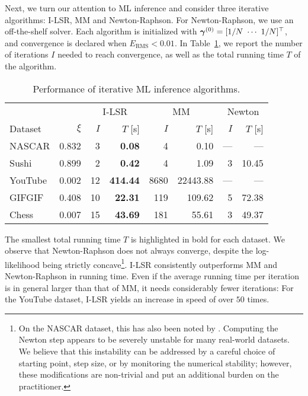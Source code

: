 Next, we turn our attention to ML inference and consider three iterative algorithms: I-LSR, MM and Newton-Raphson.
For Newton-Raphson, we use an off-the-shelf solver.
Each algorithm is initialized with $\bm{\gamma}^{(0)} = [1/N \  \cdots \  1/N]^\top$, and convergence is declared when $E_{\text{RMS}} < 0.01$.
In Table~\ref{fi:tab:mlalg}, we report the number of iterations $I$ needed to reach convergence, as well as the total running time $T$ of the algorithm.

\begin{table}[ht]
  \caption{Performance of iterative ML inference algorithms.}
  \label{fi:tab:mlalg}
  \centering
  \small{
  \begin{tabular}{l r rr rr rr}
    \toprule
             &             & \multicolumn{2}{c}{I-LSR}        & \multicolumn{2}{c}{MM}      & \multicolumn{2}{c}{Newton} \\
                             \cmidrule(l){3-4}                  \cmidrule(l){5-6}             \cmidrule(l){7-8}
    Dataset  & $\xi$               & $I$ &         $T$ [s] &        $I$ &        $T$ [s] &     $I$ &     $T$ [s] \\
    \midrule
    NASCAR   & \num{0.832} &  \num{3} &   \bfseries\num{0.08} &    \num{4} &     \num{0.10} &     --- &         --- \\
    Sushi    & \num{0.899} &  \num{2} &   \bfseries\num{0.42} &    \num{4} &     \num{1.09} & \num{3} & \num{10.45} \\
    \addlinespace
    YouTube  & \num{0.002} & \num{12} & \bfseries\num{414.44} & \num{8680} & \num{22443.88} &     --- &         --- \\
    GIFGIF   & \num{0.408} & \num{10} &  \bfseries\num{22.31} &  \num{119} &   \num{109.62} & \num{5} & \num{72.38} \\
    \addlinespace
    Chess    & \num{0.007} & \num{15} &  \bfseries\num{43.69} &  \num{181} &    \num{55.61} & \num{3} & \num{49.37} \\
    \bottomrule
  \end{tabular}
  }
\end{table}

The smallest total running time $T$ is highlighted in bold for each dataset.
We observe that Newton-Raphson does not always converge, despite the log-likelihood being strictly concave\footnote{%
On the NASCAR dataset, this has also been noted by \citet{hunter2004mm}.
Computing the Newton step appears to be severely unstable for many real-world datasets.
We believe that this instability can be addressed by a careful choice of starting point, step size, or by monitoring the numerical stability;
however, these modifications are non-trivial and put an additional burden on the practitioner.
}.
I-LSR consistently outperforms MM and Newton-Raphson in running time.
Even if the average running time per iteration is in general larger than that of MM, it needs considerably fewer iterations:
For the YouTube dataset, I-LSR yields an increase in speed of over $50$ times.

